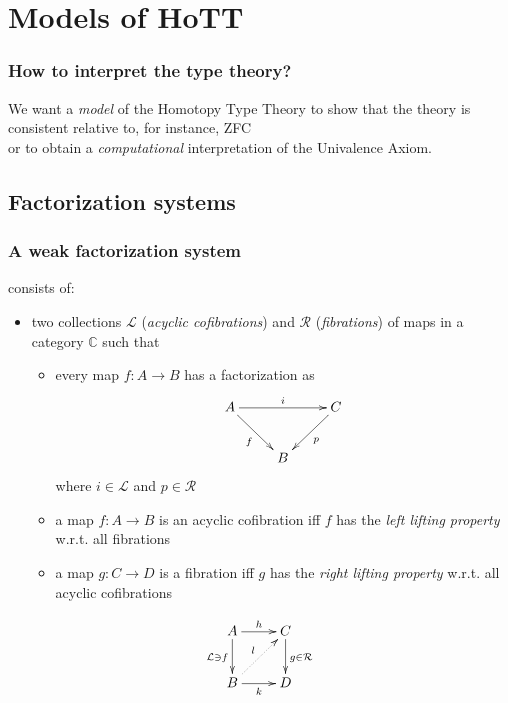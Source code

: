 \documentclass[dvipdfmx]{beamer}
\begin{document}
\section{Models of HoTT}

\begin{frame}
  \frametitle{How to interpret the type theory?}
  We want a {\it model} of the Homotopy Type Theory
  to show that the theory is consistent relative to,
  for instance, ZFC
  \\
  or
  to obtain a {\it computational} interpretation of
  the Univalence Axiom.\nocite{bezem_et_all:LIPIcs:20144628}
\end{frame}

\subsection{Factorization systems}

\begin{frame}
  \frametitle{A weak factorization system
  \cite{warren2008homotopy,awodey2007homotopy}}
  consists of:
  \begin{itemize}
    \item two collections ${\mathcal L}$ ({\it acyclic cofibrations})
      and ${\mathcal R}$ ({\it fibrations})
      of maps in a category ${\mathbb C}$
      such that
      \begin{itemize}
          \pause
        \item every map $f : A \to B$ has a factorization as
          \[
            \xymatrix{
              A \ar[rr]^{i} \ar[dr]_{f}
              &
              & C \ar[dl]^{p}
              \\
              & B
              &
            }
          \]
          where $i \in {\mathcal L}$ and $p \in {\mathcal R}$
          \pause
        \item a map $f : A \to B$ is an acyclic cofibration iff
          $f$ has the {\it left lifting property} w.r.t.
          all fibrations
        \item a map $g : C \to D$ is a fibration iff
          $g$ has the {\it right lifting property} w.r.t.
          all acyclic cofibrations
      \end{itemize}
  \end{itemize}
  \[
    \xymatrix{
      A \ar[r]^{h} \ar[d]_{ {\mathcal L} \ni f}
      & C \ar[d]^{g \in {\mathcal R}}
      \\
      B \ar[r]_{k} \ar@{.>}[ur]^{l}
      & D
    }
  \]
\end{frame}
\end{document}
